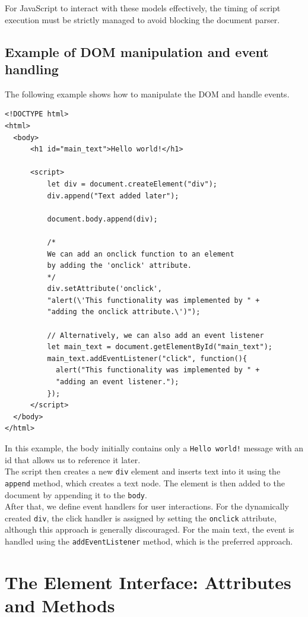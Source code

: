 \documentclass{scrbook}
\begin{document}
	For JavaScript to interact with these models effectively, the timing of script execution must be strictly managed to avoid blocking the document parser.
	
	\subsection{Example of DOM manipulation and event handling}
	
	The following example shows how to manipulate the DOM and handle events.
	
	\begin{lstlisting}
<!DOCTYPE html>
<html>
  <body>
	  <h1 id="main_text">Hello world!</h1>
			
	  <script>
		  let div = document.createElement("div");
		  div.append("Text added later");
				
		  document.body.append(div);
				
		  /*
		  We can add an onclick function to an element
		  by adding the 'onclick' attribute.
		  */
		  div.setAttribute('onclick',
		  "alert(\'This functionality was implemented by " +
		  "adding the onclick attribute.\')");
				
		  // Alternatively, we can also add an event listener
		  let main_text = document.getElementById("main_text");
		  main_text.addEventListener("click", function(){
		  	alert("This functionality was implemented by " +
		  	"adding an event listener.");
		  });
	  </script>
  </body>
</html>
	\end{lstlisting}
	
	In this example, the body initially contains only a \texttt{Hello world!} message with an id that allows us to reference it later.\\
	
	The script then creates a new \texttt{div} element and inserts text into it using the \texttt{append} method, which creates a text node. The element is then added to the document by appending it to the \texttt{body}.\\
	
	After that, we define event handlers for user interactions. For the dynamically created \texttt{div}, the click handler is assigned by setting the \texttt{onclick} attribute, although this approach is generally discouraged. For the main text, the event is handled using the \texttt{addEventListener} method, which is the preferred approach.
	
	\section{The Element Interface: Attributes and Methods}
	
\end{document}
